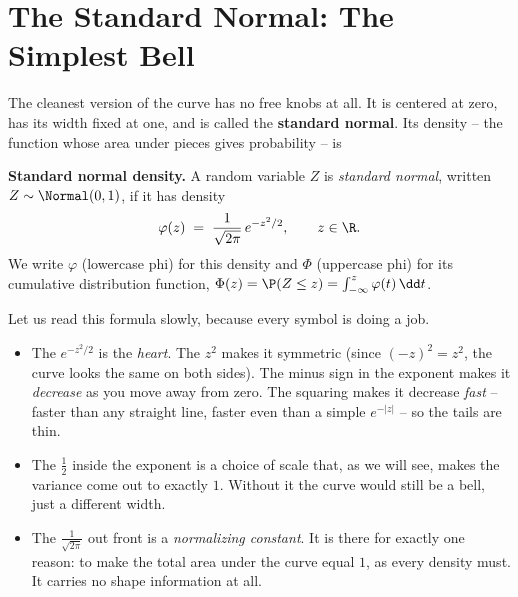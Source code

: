 \section{The Standard Normal: The Simplest Bell}
\label{ch12:standard}

The cleanest version of the curve has no free knobs at all. It is centered at
zero, has its width fixed at one, and is called the \textbf{standard normal}. Its
density -- the function whose area under pieces gives probability -- is

\begin{formalbox}
\textbf{Standard normal density.} A random variable $Z$ is \emph{standard normal},
written $Z \sim \Normal(0,1)$, if it has density
\[
  \varphi(z) \;=\; \frac{1}{\sqrt{2\pi}}\, e^{-z^2/2}, \qquad z \in \R.
\]
We write $\varphi$ (lowercase phi) for this density and $\Phi$ (uppercase phi)
for its cumulative distribution function, $\Phi(z) = \P(Z \le z) = \int_{-\infty}^{z}\varphi(t)\,\dd t$.
\end{formalbox}

Let us read this formula slowly, because every symbol is doing a job.

\begin{itemize}
  \item The $e^{-z^2/2}$ is the \emph{heart}. The $z^2$ makes it symmetric (since
  $(-z)^2 = z^2$, the curve looks the same on both sides). The minus sign in the
  exponent makes it \emph{decrease} as you move away from zero. The squaring makes
  it decrease \emph{fast} -- faster than any straight line, faster even than a
  simple $e^{-|z|}$ -- so the tails are thin.
  \item The $\tfrac{1}{2}$ inside the exponent is a choice of scale that, as we
  will see, makes the variance come out to exactly $1$. Without it the curve would
  still be a bell, just a different width.
  \item The $\tfrac{1}{\sqrt{2\pi}}$ out front is a \emph{normalizing constant}.
  It is there for exactly one reason: to make the total area under the curve equal
  $1$, as every density must. It carries no shape information at all.
\end{itemize}

